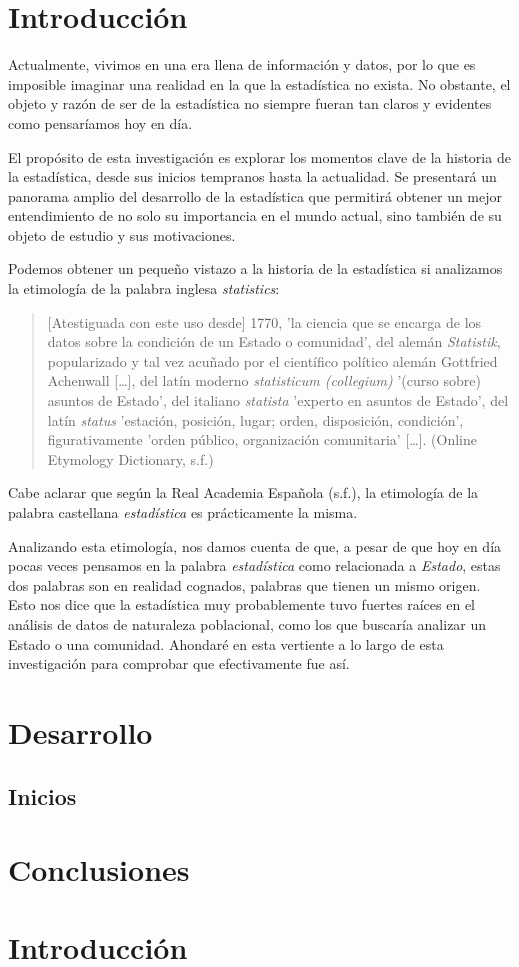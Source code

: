 \documentclass[12pt, a4paper]{article}
\begin{document}
\sffamily
{}


\section{Introducción}

Actualmente, vivimos en una era llena de información y datos, por lo que es imposible imaginar una realidad en la que la estadística no exista. No obstante, el objeto y razón de ser de la estadística no siempre fueran tan claros y evidentes como pensaríamos hoy en día.

El propósito de esta investigación es explorar los momentos clave de la historia de la estadística, desde sus inicios tempranos hasta la actualidad. Se presentará un panorama amplio del desarrollo de la estadística que permitirá obtener un mejor entendimiento de no solo su importancia en el mundo actual, sino también de su objeto de estudio y sus motivaciones.

Podemos obtener un pequeño vistazo a la historia de la estadística si analizamos la etimología de la palabra inglesa \textit{statistics}:

\begin{quote}
	[Atestiguada con este uso desde] 1770, 'la ciencia que se encarga de los datos sobre la condición de un Estado o comunidad', del alemán \textit{Statistik}, popularizado y tal vez acuñado por el científico político alemán Gottfried Achenwall […], del latín moderno \textit{statisticum (collegium)} '(curso sobre) asuntos de Estado', del italiano \textit{statista} 'experto en asuntos de Estado', del latín \textit{status} 'estación, posición, lugar; orden, disposición, condición', figurativamente 'orden público, organización comunitaria' […]. (Online Etymology Dictionary, s.f.)
\end{quote}

Cabe aclarar que según la Real Academia Española (s.f.), la etimología de la palabra castellana \textit{estadística} es prácticamente la misma.

Analizando esta etimología, nos damos cuenta de que, a pesar de que hoy en día pocas veces pensamos en la palabra \textit{estadística} como relacionada a \textit{Estado}, estas dos palabras son en realidad cognados, palabras que tienen un mismo origen. Esto nos dice que la estadística muy probablemente tuvo fuertes raíces en el análisis de datos de naturaleza poblacional, como los que buscaría analizar un Estado o una comunidad. Ahondaré en esta vertiente a lo largo de esta investigación para comprobar que efectivamente fue así.

\section{Desarrollo}

\subsection{Inicios}



\section{Conclusiones}

\section{Introducción}
\end{document}
